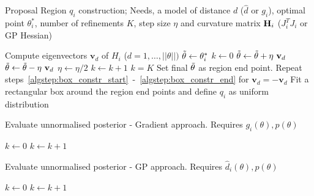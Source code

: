 \begin{algorithm}[!ht]
	\caption{Proposal Region $q_i$ construction; Needs, a model of distance $d$ ($\hat{d}$ or $g_i$), optimal point $\theta_i^*$, number of refinements $K$, step size $\eta$ and curvature matrix $\mathbf{H}_i$ ($J_i^TJ_i $ or GP Hessian)}\label{alg:region_construction}
	\begin{algorithmic}[1]
	\State Compute eigenvectors $\mathbf{v}_{d}$ of $H_i$ {\scriptsize ($d = 1,\ldots,||\theta ||)$}
		\State $\Tilde{\theta} \gets \theta_i^*$ \label{algstep:box_constr_start}
		\State $k \gets 0$
		\Repeat
        	\Repeat
                \State $\Tilde{\theta} \gets \Tilde{\theta} + \eta \ \mathbf{v}_{d}$ 
        	\State $\Tilde{\theta} \gets \Tilde{\theta} - \eta \ \mathbf{v}_{d}$
        	\State $\eta \gets \eta/2$ 
        	\State $k \gets k + 1$
    	\Until $k = K$
    	\State Set final $\Tilde{\theta}$ as region end point. \label{algstep:box_constr_end}
    	\State Repeat steps~\ref{algstep:box_constr_start}~-~\ref{algstep:box_constr_end} for $\mathbf{v}_{d} = - \mathbf{v}_{d}$
	\EndFor
	\State Fit a rectangular box around the region end points and define $q_i$ as uniform distribution
	\end{algorithmic}
\end{algorithm}

\begin{minipage}{0.46\textwidth}
\begin{algorithm}[H]
    \centering
    \caption{Evaluate unnormalised posterior - Gradient approach. Requires $g_i(\theta), p(\theta)$}\label{alg:posterior_GB}
    \begin{algorithmic}[1]
      \State $k \leftarrow 0$
            \State $k \leftarrow k + 1$
          \EndIf
          \EndFor
    \end{algorithmic}
\end{algorithm}
\end{minipage}
\hfill
\begin{minipage}{0.46\textwidth}
\begin{algorithm}[H]
    \centering
    \caption{Evaluate unnormalised posterior - GP approach. Requires $\hat{d}_i(\theta), p(\theta)$}\label{alg:posterior_GP}
    \begin{algorithmic}[1]
      \State $k \leftarrow 0$
            \State $k \leftarrow k + 1$
          \EndIf
          \EndFor
    \end{algorithmic}
\end{algorithm}
\end{minipage}


